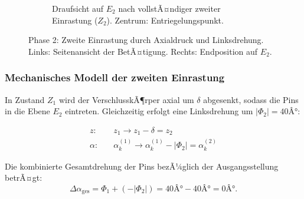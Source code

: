 ﻿\documentclass[12pt, a4paper]{article}
\theoremstyle{remark}
\begin{document}
\begin{figure}[H]
\begin{subfigure}[b]{0.48\textwidth}
    \caption{Draufsicht auf $E_2$ nach vollstÃ¤ndiger zweiter Einrastung ($Z_2$). Zentrum: Entriegelungspunkt.}
  \end{subfigure}
  \caption{Phase 2: Zweite Einrastung durch Axialdruck und Linksdrehung. Links: Seitenansicht der BetÃ¤tigung. Rechts: Endposition auf $E_2$.}
  \label{fig:phase2}
\end{figure}

\subsubsection{Mechanisches Modell der zweiten Einrastung}

In Zustand $Z_1$ wird der VerschlusskÃ¶rper axial um $\delta$ abgesenkt, sodass die
Pins in die Ebene $E_2$ eintreten. Gleichzeitig erfolgt eine Linksdrehung um $|\Phi_2| = 40Â°$:

\begin{align}
  z: \quad & z_1 \to z_1 - \delta = z_2 \\
  \alpha: \quad & \alpha_k^{(1)} \to \alpha_k^{(1)} - |\Phi_2| = \alpha_k^{(2)}
\end{align}

Die kombinierte Gesamtdrehung der Pins bezÃ¼glich der Ausgangsstellung betrÃ¤gt:
\begin{equation}
  \Delta\alpha_{\text{ges}} = \Phi_1 + (-|\Phi_2|) = 40Â° - 40Â° = 0Â°.
\end{equation}
\end{document}
